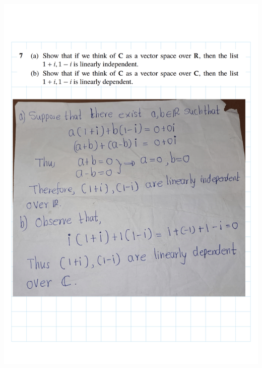 \documentclass[
]{book}
\theoremstyle{definition}
\theoremstyle{definition}
\theoremstyle{definition}
\theoremstyle{definition}
\theoremstyle{remark}
\begin{document}
\includegraphics{fig/Ex2A/Ex2A-09.png}
\end{document}

